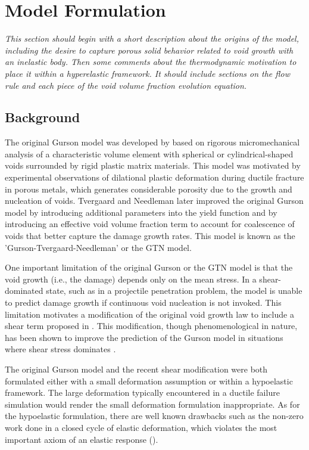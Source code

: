 \chapter{Model Formulation}
\label{model-form}

\textit{This section should begin with a short description about the
  origins of the model, including the desire to capture porous solid
  behavior related to void growth with an inelastic body. Then some
  comments about the thermodynamic motivation to place it within a
  hyperelastic framework. It should include sections on the flow rule
  and each piece of the void volume fraction evolution equation.}

\section{Background}

The original Gurson model was developed by \cite{Gurson1977} based on rigorous micromechanical analysis of a characteristic volume element with spherical or cylindrical-shaped voids surrounded by rigid plastic matrix materials. This model was motivated by experimental observations of dilational plastic deformation during ductile fracture in porous metals, which generates considerable porosity due to the growth and nucleation of voids. Tvergaard and Needleman \cite{Tvergaard1984} later improved the original Gurson model by introducing additional parameters into the yield function and by introducing an effective void volume fraction term to account for coalescence of voids that better capture the damage growth rates. This model is known as the 'Gurson-Tvergaard-Needleman' or the GTN model.

One important limitation of the original Gurson or the GTN model is that the void growth (i.e., the damage) depends only on the mean stress. In a shear-dominated state, such as in a projectile penetration problem, the model is unable to predict damage growth if continuous void nucleation is not invoked. This limitation motivates a modification of the original void growth law to include a shear term proposed in \cite{Nahshon2008}. This modification, though phenomenological in nature, has been shown to improve the prediction of the Gurson model in situations where shear stress dominates \cite{Nahshon2008,Nahshon2009}. 

The original Gurson model and the recent shear modification were both formulated either with a small deformation assumption or within a hypoelastic framework. The large deformation typically encountered in a ductile failure simulation would render the small deformation formulation inappropriate. As for the hypoelastic formulation, there are well known drawbacks such as the non-zero work done in a closed cycle of elastic deformation, which violates the most important axiom of an elastic response (\cite{Belytschko2013}).

